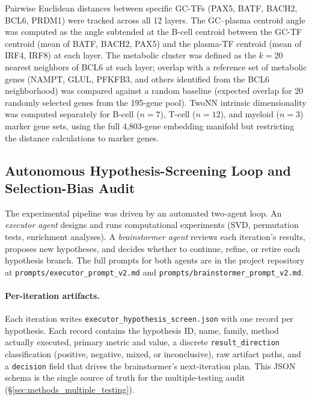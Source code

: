 \documentclass[12pt]{article}
\begin{document}
Pairwise Euclidean distances between specific GC-TFs (PAX5, BATF, BACH2, BCL6, PRDM1) were tracked across all 12 layers.
The GC--plasma centroid angle was computed as the angle subtended at the B-cell centroid between the GC-TF centroid (mean of BATF, BACH2, PAX5) and the plasma-TF centroid (mean of IRF4, IRF8) at each layer.
The metabolic cluster was defined as the $k = 20$ nearest neighbors of BCL6 at each layer; overlap with a reference set of metabolic genes (NAMPT, GLUL, PFKFB3, and others identified from the BCL6 neighborhood) was compared against a random baseline (expected overlap for 20 randomly selected genes from the 195-gene pool).
TwoNN intrinsic dimensionality was computed separately for B-cell ($n = 7$), T-cell ($n = 12$), and myeloid ($n = 3$) marker gene sets, using the full 4{,}803-gene embedding manifold but restricting the distance calculations to marker genes.

\subsection{Autonomous Hypothesis-Screening Loop and Selection-Bias Audit}
\label{sec:methods_loop}

The experimental pipeline was driven by an automated two-agent loop.
An \emph{executor agent} designs and runs computational experiments (SVD, permutation tests, enrichment analyses).
A \emph{brainstormer agent} reviews each iteration's results, proposes new hypotheses, and decides whether to continue, refine, or retire each hypothesis branch.
The full prompts for both agents are in the project repository at \texttt{prompts/executor\_prompt\_v2.md} and \texttt{prompts/brainstormer\_prompt\_v2.md}.

\paragraph{Per-iteration artifacts.}
Each iteration writes \texttt{executor\_hypothesis\_screen.json} with one record per hypothesis.
Each record contains the hypothesis ID, name, family, method actually executed, primary metric and value, a discrete \texttt{result\_direction} classification (positive, negative, mixed, or inconclusive), raw artifact paths, and a \texttt{decision} field that drives the brainstormer's next-iteration plan.
This JSON schema is the single source of truth for the multiple-testing audit (§\ref{sec:methods_multiple_testing}).
\end{document}

